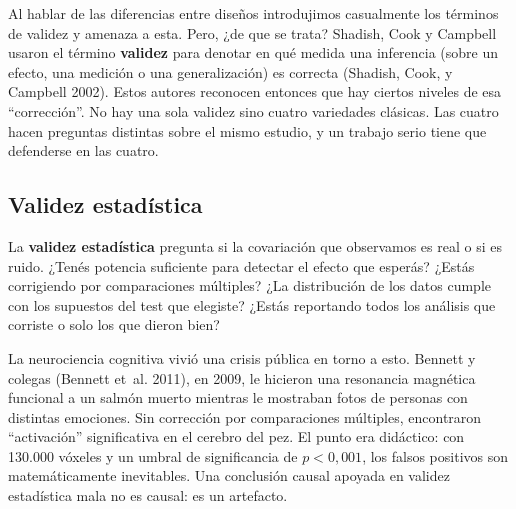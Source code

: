 \documentclass[
  letterpaper,
  DIV=11,
  numbers=noendperiod,
  oneside]{scrreprt}
\begin{document}
Al hablar de las diferencias entre diseños introdujimos casualmente los
términos de validez y amenaza a esta. Pero, ¿de que se trata? Shadish,
Cook y Campbell usaron el término \textbf{validez} para denotar en qué
medida una inferencia (sobre un efecto, una medición o una
generalización) es correcta (Shadish, Cook, y Campbell
2002).
Estos autores reconocen entonces que hay ciertos niveles de esa
``corrección''. No hay una sola validez sino cuatro variedades clásicas.
Las cuatro hacen preguntas distintas sobre el mismo estudio, y un
trabajo serio tiene que defenderse en las cuatro.

\hypertarget{validez-estaduxedstica}{%
\subsection{Validez estadística}\label{validez-estaduxedstica}}

La \textbf{validez estadística} pregunta si la covariación que
observamos es real o si es ruido. ¿Tenés potencia suficiente para
detectar el efecto que esperás? ¿Estás corrigiendo por comparaciones
múltiples? ¿La distribución de los datos cumple con los supuestos del
test que elegiste? ¿Estás reportando todos los análisis que corriste o
solo los que dieron bien?

La neurociencia cognitiva vivió una crisis pública en torno a esto.
Bennett y colegas (Bennett et~al.
2011),
en 2009, le hicieron una resonancia magnética funcional a un salmón
muerto mientras le mostraban fotos de personas con distintas emociones.
Sin corrección por comparaciones múltiples, encontraron ``activación''
significativa en el cerebro del pez. El punto era didáctico: con 130.000
vóxeles y un umbral de significancia de \(p<0{,}001\), los falsos
positivos son matemáticamente inevitables. Una conclusión causal apoyada
en validez estadística mala no es causal: es un artefacto.
\end{document}
